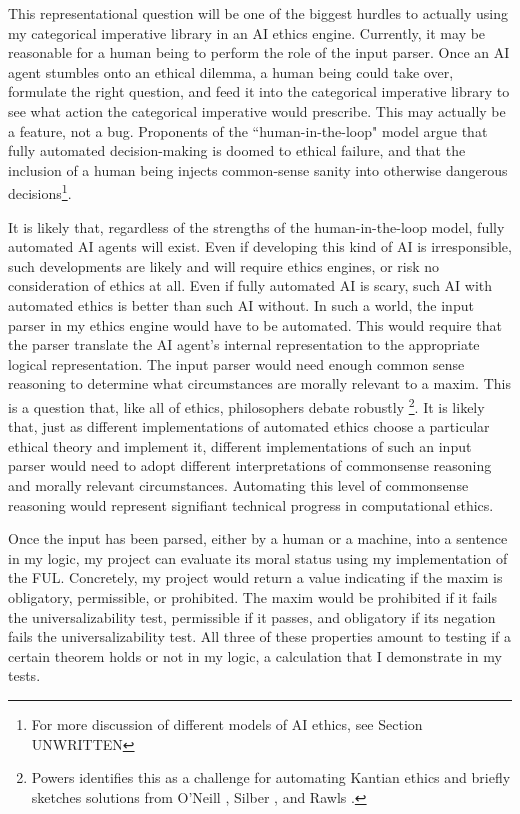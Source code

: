 \begin{isabellebody}
\begin{isamarkuptext}
This representational
question will be one of the biggest hurdles to actually using my categorical imperative library 
in an AI ethics engine. Currently, it may be reasonable for a human being to perform the role of the input
parser. Once an AI agent stumbles onto an ethical dilemma, a human being could take over, formulate 
the right question, and feed it into the categorical imperative library to see what action the categorical 
imperative would prescribe. This may actually be a feature, not a bug. 
Proponents of the ``human-in-the-loop" model argue that fully automated decision-making is doomed 
to ethical failure, and that the inclusion of a human being injects common-sense sanity into otherwise 
dangerous decisions\footnote{For more discussion of different models of AI ethics, see Section UNWRITTEN}.  

It is likely that, regardless of the strengths of the human-in-the-loop model, fully automated AI 
agents will exist. Even if developing this kind of AI is irresponsible,
such developments are likely and will require ethics engines, or risk no consideration of ethics at all. Even if 
fully automated AI is scary, such AI with automated ethics is better than such AI without. 
In such a world, the input parser in my ethics engine would have to be automated. This would require 
that the parser translate the AI agent's internal representation to the appropriate logical representation.
The input parser would need enough common sense reasoning to determine what circumstances are morally 
relevant to a maxim. This is a question that, like all of ethics, philosophers debate robustly
\footnote{Powers \cite{powers} identifies this as a challenge for automating Kantian ethics and briefly sketches 
solutions from O'Neill \cite{constofreason}, Silber \cite{silber}, and Rawls \cite{rawlsconstructivism}. }. 
It is likely that, just as different implementations of automated ethics choose 
a particular ethical theory and implement it, different implementations of such an input parser would 
need to adopt different interpretations of commonsense reasoning and morally relevant circumstances.
Automating this level of commonsense reasoning would represent signifiant technical progress in 
computational ethics.

Once the input has been parsed, either by a human or a machine, into  a sentence in my logic, my 
project can evaluate its moral status using my implementation of 
the FUL. Concretely, my project would return a value indicating if the maxim is obligatory, permissible, 
or prohibited. The maxim would be prohibited if it fails the universalizability test, permissible if it passes, and obligatory 
if its negation fails the universalizability test. All three of these properties amount to testing if a 
certain theorem holds or not in my logic, a calculation that I demonstrate in my tests. 


\end{isamarkuptext}
\end{isabellebody}

